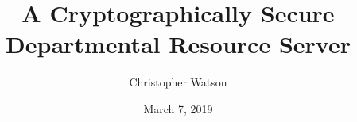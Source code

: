 \documentclass[british,table,svgnames,xcdraw]{l4proj}
\begin{document}
\title{A Cryptographically Secure Departmental Resource Server}
\author{Christopher Watson}
\date{March 7, 2019}

\maketitle

\newcommand{\thePolicyLang}{\textsc{PolLang}\textsubscript{ABE}\xspace}
\newcommand{\theResServer}{\textsc{ResSrvr}\textsubscript{ABE}\xspace}
\newcommand{\OpenABE}{\textsc{OpenABE}\xspace}
\newcommand{\PyOpenABE}{\textsc{PyOpenABE}\xspace}




%
%
\def\consentname {Christopher Watson} %
\def\consentdate {31 January 2019} %
%
\educationalconsent


\tableofcontents

%
%
%
%
%
%
%
\end{document}
